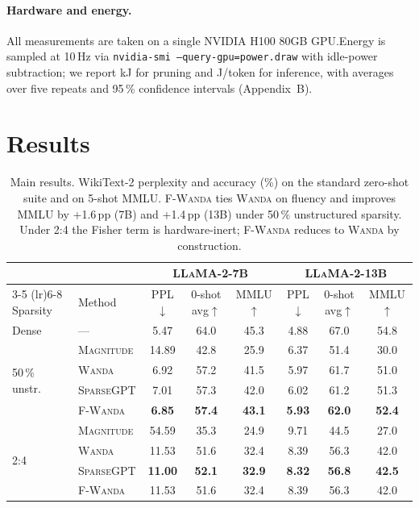 \documentclass[11pt]{article}
\newcommand{\fwanda}{\textsc{F-Wanda}}
\newcommand{\wanda}{\textsc{Wanda}}
\newcommand{\sgpt}{\textsc{SparseGPT}}
\newcommand{\mag}{\textsc{Magnitude}}
\begin{document}
\paragraph{Hardware and energy.}
All measurements are taken on a single NVIDIA H100 80GB
GPU.\@ Energy is sampled at 10\,Hz via \texttt{nvidia-smi --query-gpu=power.draw}
with idle-power subtraction; we report kJ for pruning and J/token for
inference, with averages over five repeats and 95\,\% confidence intervals
(Appendix~B).

\section{Results}

\begin{table}[t]
\centering
\small
\setlength{\tabcolsep}{4.5pt}
\begin{tabular}{llcccccc}
\toprule
& & \multicolumn{3}{c}{\textsc{LLaMA-2-7B}} & \multicolumn{3}{c}{\textsc{LLaMA-2-13B}} \\
\cmidrule(lr){3-5} \cmidrule(lr){6-8}
Sparsity & Method & PPL$\downarrow$ & 0-shot avg$\uparrow$ & MMLU$\uparrow$ & PPL$\downarrow$ & 0-shot avg$\uparrow$ & MMLU$\uparrow$ \\
\midrule
Dense    & ---        & 5.47 & 64.0 & 45.3 & 4.88 & 67.0 & 54.8 \\
\midrule
\multirow{4}{*}{50\,\% unstr.}
& \mag       & 14.89 & 42.8 & 25.9 & 6.37  & 51.4 & 30.0 \\
& \wanda     & 6.92  & 57.2 & 41.5 & 5.97  & 61.7 & 51.0 \\
& \sgpt      & 7.01  & 57.3 & 42.0 & 6.02  & 61.2 & 51.3 \\
& \fwanda    & \textbf{6.85} & \textbf{57.4} & \textbf{43.1} & \textbf{5.93} & \textbf{62.0} & \textbf{52.4} \\
\midrule
\multirow{4}{*}{2{:}4}
& \mag       & 54.59 & 35.3 & 24.9 & 9.71 & 44.5 & 27.0 \\
& \wanda     & 11.53 & 51.6 & 32.4 & 8.39 & 56.3 & 42.0 \\
& \sgpt      & \textbf{11.00} & \textbf{52.1} & \textbf{32.9} & \textbf{8.32} & \textbf{56.8} & \textbf{42.5} \\
& \fwanda    & 11.53 & 51.6 & 32.4 & 8.39 & 56.3 & 42.0 \\
\bottomrule
\end{tabular}
\caption{Main results. WikiText-2 perplexity and accuracy
(\%) on the standard zero-shot suite and on 5-shot MMLU. \fwanda{} ties
\wanda{} on fluency and improves MMLU by +1.6\,pp (7B) and +1.4\,pp (13B)
under 50\,\% unstructured sparsity. Under 2{:}4 the Fisher term is
hardware-inert; \fwanda{} reduces to \wanda{} by construction.}
\label{tab:main}
\end{table}
\end{document}
